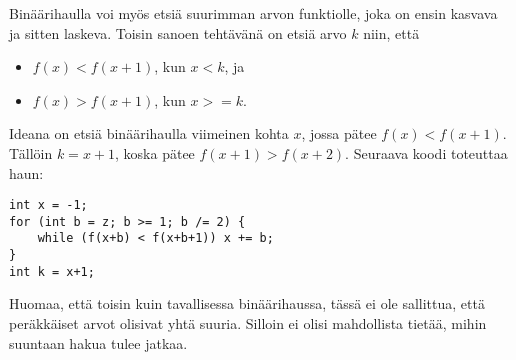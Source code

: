 Binäärihaulla voi myös etsiä
suurimman arvon funktiolle,
joka on ensin kasvava ja sitten laskeva.
Toisin sanoen tehtävänä on etsiä arvo
$k$ niin, että

\begin{itemize}
\item
$f(x)<f(x+1)$, kun $x<k$, ja
\item
$f(x)>f(x+1)$, kun $x >= k$.
\end{itemize}

Ideana on etsiä binäärihaulla
viimeinen kohta $x$,
jossa pätee $f(x)<f(x+1)$.
Tällöin $k=x+1$,
koska pätee $f(x+1)>f(x+2)$.
Seuraava koodi toteuttaa haun: 

\begin{lstlisting}
int x = -1;
for (int b = z; b >= 1; b /= 2) {
    while (f(x+b) < f(x+b+1)) x += b;
}
int k = x+1;
\end{lstlisting}

Huomaa, että toisin kuin tavallisessa binäärihaussa,
tässä ei ole sallittua,
että peräkkäiset arvot olisivat yhtä suuria.
Silloin ei olisi mahdollista tietää,
mihin suuntaan hakua tulee jatkaa.



